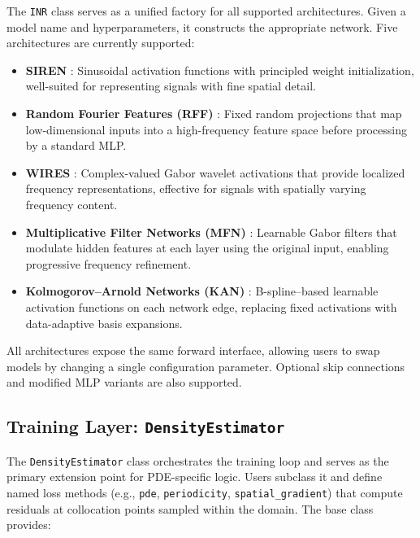\documentclass[11pt,a4paper]{article}
\begin{document}
The \texttt{INR} class serves as a unified factory for all supported architectures. Given a model name and hyperparameters, it constructs the appropriate network. Five architectures are currently supported:

\begin{itemize}
    \item \textbf{SIREN} \citep{sitzmann2020implicit}: Sinusoidal activation functions with principled weight initialization, well-suited for representing signals with fine spatial detail.
    \item \textbf{Random Fourier Features (RFF)} \citep{tancik2020fourier}: Fixed random projections that map low-dimensional inputs into a high-frequency feature space before processing by a standard MLP.
    \item \textbf{WIRES} \citep{saragadam2023wire}: Complex-valued Gabor wavelet activations that provide localized frequency representations, effective for signals with spatially varying frequency content.
    \item \textbf{Multiplicative Filter Networks (MFN)} \citep{fathony2021multiplicative}: Learnable Gabor filters that modulate hidden features at each layer using the original input, enabling progressive frequency refinement.
    \item \textbf{Kolmogorov--Arnold Networks (KAN)} \citep{liu2024kan}: B-spline--based learnable activation functions on each network edge, replacing fixed activations with data-adaptive basis expansions.
\end{itemize}

All architectures expose the same forward interface, allowing users to swap models by changing a single configuration parameter. Optional skip connections and modified MLP variants are also supported.

\subsection{Training Layer: \texttt{DensityEstimator}}

The \texttt{DensityEstimator} class orchestrates the training loop and serves as the primary extension point for PDE-specific logic. Users subclass it and define named loss methods (e.g., \texttt{pde}, \texttt{periodicity}, \texttt{spatial\_gradient}) that compute residuals at collocation points sampled within the domain. The base class provides:
\end{document}
